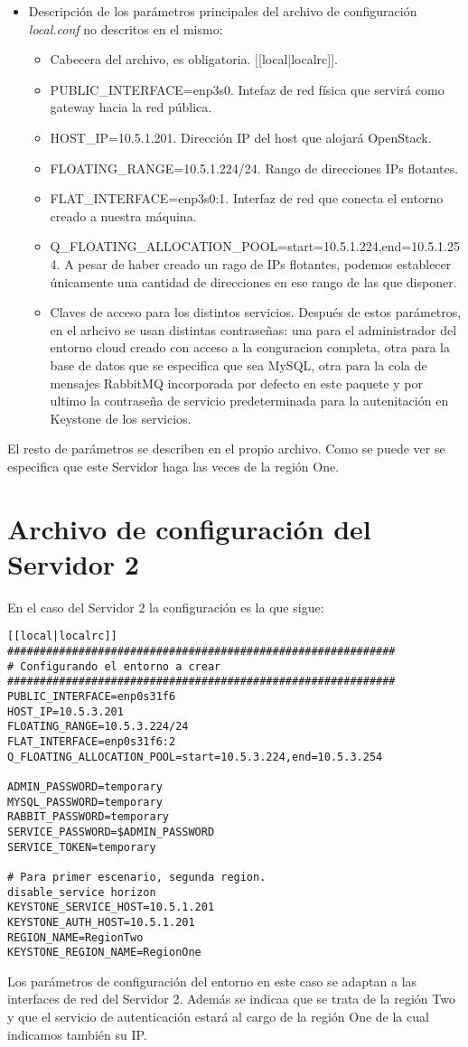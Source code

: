 \begin{itemize}
\item Descripción de los parámetros principales del archivo de configuración \textit{local.conf} no descritos en el mismo:

\begin{itemize}
\item Cabecera del archivo, es obligatoria. [[local|localrc]]. 
\item PUBLIC\_INTERFACE=enp3s0. Intefaz de red física que servirá como gateway hacia la red pública.
\item HOST\_IP=10.5.1.201. Dirección IP del host que alojará OpenStack.
\item FLOATING\_RANGE=10.5.1.224/24. Rango de direcciones IPs flotantes.
\item FLAT\_INTERFACE=enp3s0:1. Interfaz de red que conecta el entorno creado a nuestra máquina.
\item Q\_FLOATING\_ALLOCATION\_POOL=start=10.5.1.224,end=10.5.1.254. A pesar de haber creado un rago de IPs flotantes, podemos establecer únicamente una cantidad de direcciones en ese rango de las que disponer.
\item Claves de acceso para los distintos servicios. Después de estos parámetros, en el arhcivo se usan distintas contraseñas: una para el administrador del entorno cloud creado con acceso a la conguracion completa, otra para la base de
datos que se especifica que sea MySQL, otra para la cola de mensajes RabbitMQ incorporada por defecto en este paquete  y por ultimo la contraseña de servicio predeterminada para la autenitación en Keystone de los servicios.
\end{itemize}
\end{itemize}

El resto de parámetros se describen en el propio archivo. Como se puede ver se especifica que este Servidor haga las veces de la región One.

\section{Archivo de configuración del Servidor 2}\label{sec:ConfServer2}
En el caso del Servidor 2 la configuración es la que sigue:

\begin{lstlisting}[style=Consola]
[[local|localrc]]
############################################################
# Configurando el entorno a crear
############################################################
PUBLIC_INTERFACE=enp0s31f6
HOST_IP=10.5.3.201
FLOATING_RANGE=10.5.3.224/24
FLAT_INTERFACE=enp0s31f6:2
Q_FLOATING_ALLOCATION_POOL=start=10.5.3.224,end=10.5.3.254

ADMIN_PASSWORD=temporary
MYSQL_PASSWORD=temporary
RABBIT_PASSWORD=temporary
SERVICE_PASSWORD=$ADMIN_PASSWORD
SERVICE_TOKEN=temporary

# Para primer escenario, segunda region.
disable_service horizon
KEYSTONE_SERVICE_HOST=10.5.1.201
KEYSTONE_AUTH_HOST=10.5.1.201
REGION_NAME=RegionTwo
KEYSTONE_REGION_NAME=RegionOne
\end{lstlisting}

Los parámetros de configuración del entorno en este caso se adaptan a las interfaces de red del Servidor 2. Además se indicaa que se trata de la región Two y que el servicio de autenticación estará al cargo de la región One de la cual indicamos también su IP.